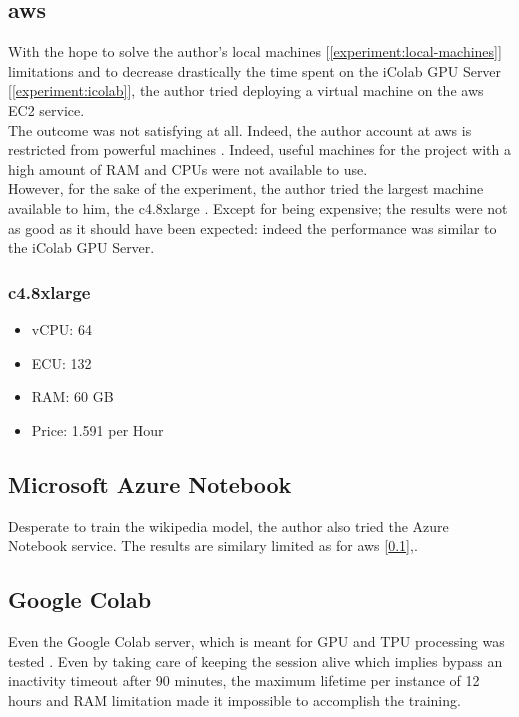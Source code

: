 \subsection{\gls{aws}}
\label{experiment:aws}
With the hope to solve the author's local machines [\ref{experiment:local-machines}] limitations and to decrease drastically the time spent on the iColab GPU Server [\ref{experiment:icolab}], the author tried deploying a virtual machine on the \gls{aws} EC2 service\cite{article:aws-ec2-dl-install}.\\

The outcome was not satisfying at all. Indeed, the author account at \gls{aws} is restricted from powerful machines \cite{article:aws-ec2-service-limits}. Indeed, useful machines for the project with a high amount of RAM and CPUs were not available to use. \\

However, for the sake of the experiment, the author tried the largest machine available to him, the c4.8xlarge \cite{article:aws-ec2-pricing}. Except for being expensive; the results were not as good as it should have been expected: indeed the performance was similar to the iColab GPU Server.

\subsubsection{c4.8xlarge}
\begin{itemize}
    \setlength\itemsep{0em}
    \item vCPU: 64
    \item ECU: 132
    \item RAM: 60 GB
    \item Price: 1.591 per Hour
\end{itemize}


\subsection{Microsoft Azure Notebook}
\label{experiment:azure-notebook}
Desperate to train the wikipedia model, the author also tried the Azure Notebook service\cite{article:azure-notebook}. The results are similary limited as for \gls{aws} [\ref{experiment:aws}],.


\subsection{Google Colab}
\label{experiment:google-colab}
Even the Google Colab server, which is meant for GPU and TPU processing was tested \cite{article:google-colab}. Even by taking care of keeping the session alive which implies bypass an inactivity timeout after 90 minutes\cite{article:google-colab-timeout}, the maximum lifetime per instance of 12 hours \cite{article:google-colab-faqs} and RAM limitation made it impossible to accomplish the training.


